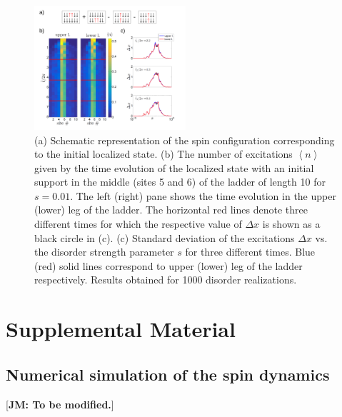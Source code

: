 \documentclass[prl,aps,twocolumn,showpacs,superscriptaddress,longbibliography]{revtex4-1}
\newcommand{\lan}{\left\langle}
\newcommand{\ran}{\right\rangle}
\newcommand{\av}[1]{\lan #1 \ran}
\begin{document}
\begin{figure}

	      \includegraphics[width=0.5\textwidth]{graphics/time_evolution_CLS_PaperSupport.pdf}
		\caption{(a) Schematic representation of the spin configuration corresponding to the initial localized state. (b) The number of excitations $\av{n}$ given by the time evolution of the localized state with an initial support in the middle (sites 5 and 6) of the ladder of length 10 for $s=0.01$. The left (right) pane shows the time evolution in the upper (lower) leg of the ladder. The horizontal red lines denote three different times for which the respective value of $\Delta x$ is shown as a black circle in (c). (c) Standard deviation of the excitations $\Delta x$ vs. the disorder strength parameter $s$ for three different times. Blue (red) solid lines correspond to upper (lower) leg of the ladder respectively. Results obtained for 1000 disorder realizations.}

 \label{Fig:time evolution}
   
\end{figure}  



%
\section{Supplemental Material}


\subsection{Numerical simulation of the spin dynamics}

[{\bf JM: To be modified.}] \\
\end{document}
